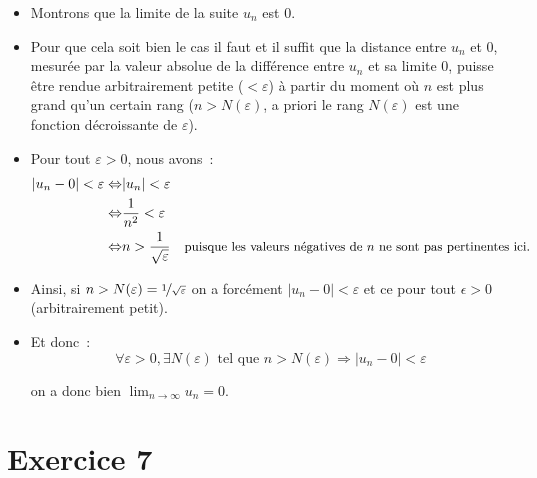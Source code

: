 \documentclass[9pt,handout,hyperref]{beamer}
\begin{document}
\begin{frame}

  \begin{itemize}
  \item Montrons que la limite de la suite $u_n$ est 0.\newline
    
  \item Pour que cela soit bien le cas il faut et il suffit que la distance entre $u_n$ et 0, mesurée par la valeur absolue de la différence entre $u_n$ et sa limite 0, puisse être rendue arbitrairement petite ($<\varepsilon$) à partir du moment où $n$ est plus grand qu'un certain rang ($n>N(\varepsilon)$, a priori le rang $N(\varepsilon)$ est une fonction décroissante de $\varepsilon$).\newline
    
  \item Pour tout $\varepsilon>0$, nous avons~:
    \[
      \begin{split}
        |u_n - 0| < \varepsilon \Leftrightarrow &  |u_n| < \varepsilon \\
        \Leftrightarrow & \frac{1}{n^2} < \varepsilon \\
        \Leftrightarrow & n > \frac{1}{\sqrt{\varepsilon}} \quad\small{\text{puisque les valeurs négatives de $n$ ne sont pas pertinentes ici.}}
      \end{split}
    \]

  \item Ainsi, si $n>N(\varepsilon)=\nicefrac{1}{\sqrt{\varepsilon}}$ on a forcément $|u_n-0|<\varepsilon$ et ce pour tout $\epsilon>0$ (arbitrairement petit).\newline

  \item Et donc~:\newline
    \[
      \forall \varepsilon>0, \exists N(\varepsilon) \text{ tel que } n>N(\varepsilon) \Rightarrow |u_n-0|<\varepsilon 
    \]
    
    \bigskip

    \noindent on a donc bien $\lim_{n\rightarrow\infty}u_n=0$.
    
  \end{itemize}

\end{frame}

\section{Exercice 7}
\end{document}
